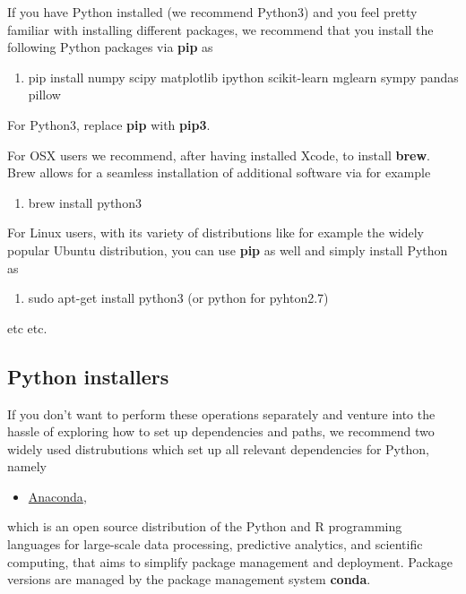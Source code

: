 \documentclass[%
oneside,                 %
final,                   %
10pt]{article}
\begin{document}
If you have Python installed (we recommend Python3) and you feel
pretty familiar with installing different packages, we recommend that
you install the following Python packages via \textbf{pip} as 

\begin{enumerate}
\item pip install numpy scipy matplotlib ipython scikit-learn mglearn sympy pandas pillow 
\end{enumerate}

\noindent
For Python3, replace \textbf{pip} with \textbf{pip3}.

For OSX users we recommend, after having installed Xcode, to
install \textbf{brew}. Brew allows for a seamless installation of additional
software via for example 

\begin{enumerate}
\item brew install python3
\end{enumerate}

\noindent
For Linux users, with its variety of distributions like for example the widely popular Ubuntu distribution,
you can use \textbf{pip} as well and simply install Python as 

\begin{enumerate}
\item sudo apt-get install python3  (or python for pyhton2.7)
\end{enumerate}

\noindent
etc etc. 



\subsection{Python installers}

If you don't want to perform these operations separately and venture
into the hassle of exploring how to set up dependencies and paths, we
recommend two widely used distrubutions which set up all relevant
dependencies for Python, namely 

\begin{itemize}
\item \href{{https://docs.anaconda.com/}}{Anaconda}, 
\end{itemize}

\noindent
which is an open source
distribution of the Python and R programming languages for large-scale
data processing, predictive analytics, and scientific computing, that
aims to simplify package management and deployment. Package versions
are managed by the package management system \textbf{conda}. 
\end{document}
